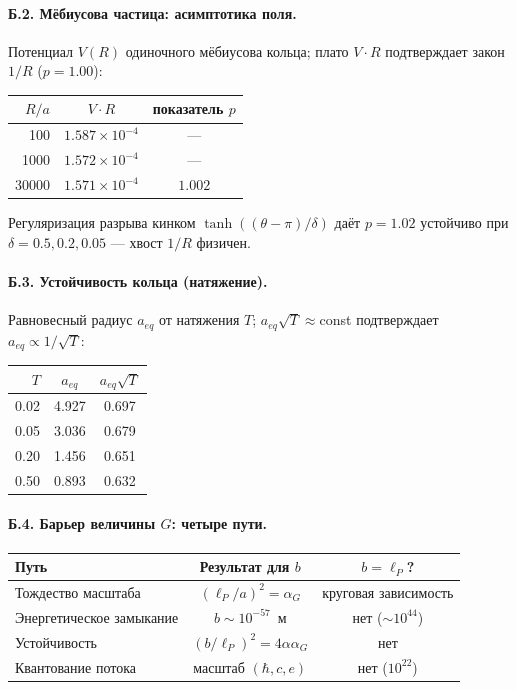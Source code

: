 \documentclass[11pt,a4paper]{article}
\begin{document}
\paragraph{Б.2. Мёбиусова частица: асимптотика поля.}
Потенциал $V(R)$ одиночного мёбиусова кольца; плато $V\!\cdot\!R$
подтверждает закон $1/R$ ($p=1.00$):
\begin{center}
\begin{tabular}{rcc}
\toprule
$R/a$ & $V\cdot R$ & показатель $p$ \\
\midrule
100   & $1.587\times10^{-4}$ & --- \\
1000  & $1.572\times10^{-4}$ & --- \\
30000 & $1.571\times10^{-4}$ & $1.002$ \\
\bottomrule
\end{tabular}
\end{center}
Регуляризация разрыва кинком $\tanh((\theta-\pi)/\delta)$ даёт $p=1.02$
устойчиво при $\delta=0.5,0.2,0.05$ --- хвост $1/R$ физичен.

\paragraph{Б.3. Устойчивость кольца (натяжение).}
Равновесный радиус $a_{eq}$ от натяжения $T$; $a_{eq}\sqrt{T}\approx$const
подтверждает $a_{eq}\propto1/\sqrt{T}$:
\begin{center}
\begin{tabular}{rcc}
\toprule
$T$ & $a_{eq}$ & $a_{eq}\sqrt{T}$ \\
\midrule
0.02 & 4.927 & 0.697 \\
0.05 & 3.036 & 0.679 \\
0.20 & 1.456 & 0.651 \\
0.50 & 0.893 & 0.632 \\
\bottomrule
\end{tabular}
\end{center}

\paragraph{Б.4. Барьер величины $G$: четыре пути.}
\begin{center}
\begin{tabular}{lcc}
\toprule
Путь & Результат для $b$ & $b=\ell_P$? \\
\midrule
Тождество масштаба       & $(\ell_P/a)^2=\alpha_G$ & круговая зависимость \\
Энергетическое замыкание & $b\sim10^{-57}$~м & нет ($\sim10^{44}$) \\
Устойчивость             & $(b/\ell_P)^2=4\alpha\alpha_G$ & нет \\
Квантование потока       & масштаб $(\hbar,c,e)$ & нет ($10^{22}$) \\
\bottomrule
\end{tabular}
\end{center}
\end{document}
